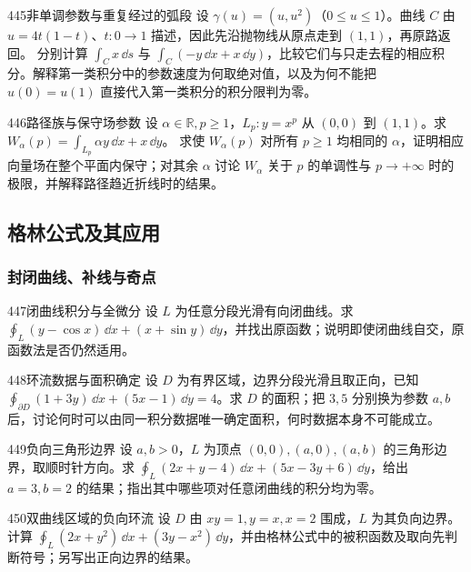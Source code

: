 \begin{exercise}{445}{非单调参数与重复经过的弧段}
设 $\gamma(u)=(u,u^2)$（$0\leq u\leq1$）。曲线 $C$ 由 $u=4t(1-t)$、$t:0\to1$ 描述，因此先沿抛物线从原点走到 $(1,1)$，再原路返回。
分别计算 $\int_Cx\,\dd s$ 与 $\int_C(-y\,\dd x+x\,\dd y)$，比较它们与只走去程的相应积分。解释第一类积分中的参数速度为何取绝对值，以及为何不能把 $u(0)=u(1)$ 直接代入第一类积分的积分限判为零。
\end{exercise}

\begin{exercise}{446}{路径族与保守场参数}
设 $\alpha\in\mathbb R,p\geq1$，$L_p:y=x^p$ 从 $(0,0)$ 到 $(1,1)$。求
$W_\alpha(p)=\int_{L_p}\alpha y\,\dd x+x\,\dd y$。
求使 $W_\alpha(p)$ 对所有 $p\geq1$ 均相同的 $\alpha$，证明相应向量场在整个平面内保守；对其余 $\alpha$ 讨论 $W_\alpha$ 关于 $p$ 的单调性与 $p\to+\infty$ 时的极限，并解释路径趋近折线时的结果。
\end{exercise}

\subsection{格林公式及其应用}
\subsubsection{封闭曲线、补线与奇点}

\begin{exercise}{447}{闭曲线积分与全微分}
设 $L$ 为任意分段光滑有向闭曲线。求 $\oint_L(y-\cos x)\,\dd x+(x+\sin y)\,\dd y$，并找出原函数；说明即使闭曲线自交，原函数法是否仍然适用。
\end{exercise}

\begin{exercise}{448}{环流数据与面积确定}
设 $D$ 为有界区域，边界分段光滑且取正向，已知 $\oint_{\partial D}(1+3y)\,\dd x+(5x-1)\,\dd y=4$。求 $D$ 的面积；把 $3,5$ 分别换为参数 $a,b$ 后，讨论何时可以由同一积分数据唯一确定面积，何时数据本身不可能成立。
\end{exercise}

\begin{exercise}{449}{负向三角形边界}
设 $a,b>0$，$L$ 为顶点 $(0,0),(a,0),(a,b)$ 的三角形边界，取顺时针方向。求 $\oint_L(2x+y-4)\,\dd x+(5x-3y+6)\,\dd y$，给出 $a=3,b=2$ 的结果；指出其中哪些项对任意闭曲线的积分均为零。
\end{exercise}

\begin{exercise}{450}{双曲线区域的负向环流}
设 $D$ 由 $xy=1,y=x,x=2$ 围成，$L$ 为其负向边界。计算 $\oint_L(2x+y^2)\,\dd x+(3y-x^2)\,\dd y$，并由格林公式中的被积函数及取向先判断符号；另写出正向边界的结果。
\end{exercise}

